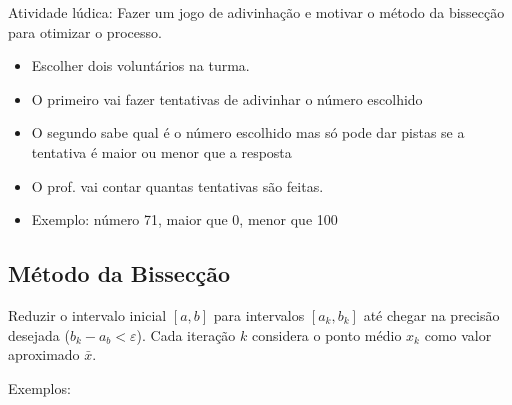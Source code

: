 \documentclass[a4paper]{article}
\begin{document}
Atividade lúdica: Fazer um jogo de adivinhação e motivar o método da
bissecção para otimizar o processo.


\begin{itemize}
\item Escolher dois voluntários na turma.
\item O primeiro vai fazer tentativas de adivinhar o número escolhido
\item O segundo sabe qual é o número escolhido mas só pode dar pistas
  se a tentativa é maior ou menor que a resposta
\item O prof. vai contar quantas tentativas são feitas.
\item Exemplo: número 71, maior que 0, menor que 100
\end{itemize}

\clearpage
\subsection*{Método da Bissecção}

Reduzir o intervalo inicial $[a,b]$ para intervalos $[a_k,b_k]$ até
chegar na precisão desejada ($b_k - a_b < \varepsilon$). Cada iteração
$k$ considera o ponto médio $x_k$ como valor aproximado $\bar{x}$.

\bigskip
\begin{center}
\end{center}
\bigskip

Exemplos: 
\end{document}
